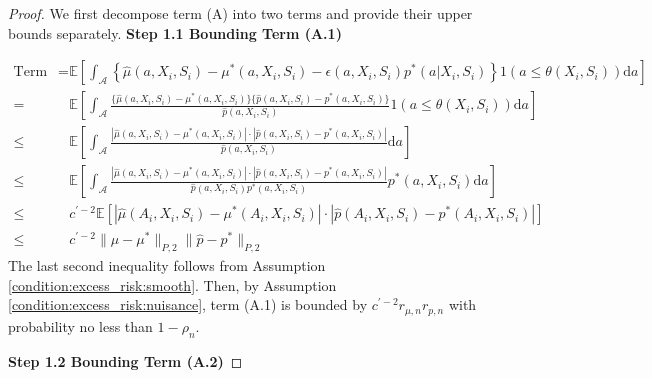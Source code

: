 \documentclass[12pt]{article}
\newcommand{\E}{\mathbb{E}}
\begin{document}
\begin{proof}
\noindent We first decompose term (A) into two terms and provide their upper bounds separately.
\noindent \textbf{Step 1.1 Bounding Term (A.1)}

\noindent 

\begin{align*}
    \text{Term (A.1)} =& \E\left[\int_{\mathcal{A}} \left\{\widehat{\mu}(a,X_i,S_i) - \mu^*(a,X_i,S_i) - \epsilon(a,X_i,S_i)p^*(a|X_i,S_i)\right\}1(a\leq \theta(X_i,S_i))\mathrm{d}a\right]\\
    = & \E\left[\int_{\mathcal{A}} \frac{\{\widehat{\mu}(a,X_i,S_i) - \mu^*(a,X_i,S_i)\}\{\widehat{p}(a,X_i,S_i) - p^*(a,X_i,S_i)\}}{\widehat{p}(a,X_i,S_i)}1(a\leq \theta(X_i,S_i))\mathrm{d}a\right]\\
    \leq & \E\left[\int_{\mathcal{A}} \frac{|\widehat{\mu}(a,X_i,S_i) - \mu^*(a,X_i,S_i)|\cdot|\widehat{p}(a,X_i,S_i) - p^*(a,X_i,S_i)|}{\widehat{p}(a,X_i,S_i)}\mathrm{d}a\right]\\
    \leq &\E\left[\int_{\mathcal{A}} \frac{|\widehat{\mu}(a,X_i,S_i) - \mu^*(a,X_i,S_i)|\cdot|\widehat{p}(a,X_i,S_i) - p^*(a,X_i,S_i)|}{\widehat{p}(a,X_i,S_i)p^*(a,X_i,S_i)}p^*(a,X_i,S_i)\mathrm{d}a\right]\\
    \leq & c^{\prime-2}\E\left[|\widehat{\mu}(A_i,X_i,S_i) - \mu^*(A_i,X_i,S_i)|\cdot|\widehat{p}(A_i,X_i,S_i) - p^*(A_i,X_i,S_i)|\right]
    \\  
    \leq & c^{\prime-2}\|\widehat{\mu} - \mu^*\|_{P,2} \|\widehat{p} - p^*\|_{P,2}
\end{align*}
The last second inequality follows from Assumption \ref{condition:excess_risk:smooth}. Then, by Assumption \ref{condition:excess_risk:nuisance}, term (A.1) is bounded by $c^{\prime-2}r_{\mu,n}r_{p,n}$ with probability no less than $1-\rho_n$.


\noindent \textbf{Step 1.2 Bounding Term (A.2)}


\end{proof}
\end{document}
